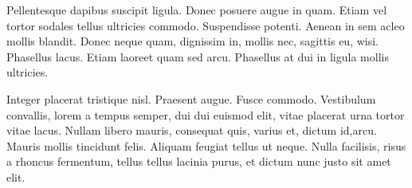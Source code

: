 \documentclass{article}
\begin{document}
Pellentesque dapibus suscipit ligula.  Donec posuere augue in quam.  Etiam vel tortor sodales tellus ultricies commodo.  Suspendisse potenti.  Aenean in sem acleo mollis blandit.  Donec neque quam, dignissim in, mollis nec, sagittis eu, wisi.  Phasellus lacus.  Etiam laoreet quam sed arcu.  Phasellus at dui in ligula mollis ultricies\cite{knuth1998art}.

Integer placerat tristique nisl.  Praesent augue.  Fusce commodo.  Vestibulum convallis, lorem a tempus semper, dui dui euismod elit, vitae placerat urna tortor vitae lacus.  Nullam libero mauris, consequat quis, varius et, dictum id,arcu.  Mauris mollis tincidunt felis.  Aliquam feugiat tellus ut neque.  Nulla facilisis, risus a rhoncus fermentum, tellus tellus lacinia purus, et dictum nunc justo sit amet elit\cite{feynman1948space}.




\end{document}
